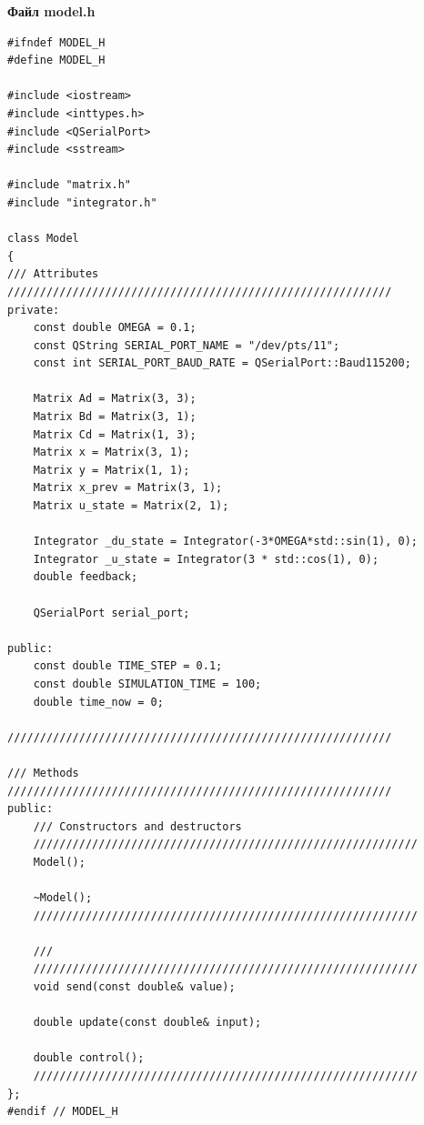 \documentclass[14pt,a4paper]{extreport}
\begin{document}
\textbf{Файл model.h}
\begin{alltt}
\begin{verbatim}
#ifndef MODEL_H
#define MODEL_H

#include <iostream>
#include <inttypes.h>
#include <QSerialPort>
#include <sstream>

#include "matrix.h"
#include "integrator.h"

class Model
{
/// Attributes
///////////////////////////////////////////////////////////
private:
    const double OMEGA = 0.1;
    const QString SERIAL_PORT_NAME = "/dev/pts/11";
    const int SERIAL_PORT_BAUD_RATE = QSerialPort::Baud115200;

    Matrix Ad = Matrix(3, 3);
    Matrix Bd = Matrix(3, 1);
    Matrix Cd = Matrix(1, 3);
    Matrix x = Matrix(3, 1);
    Matrix y = Matrix(1, 1);
    Matrix x_prev = Matrix(3, 1);
    Matrix u_state = Matrix(2, 1);

    Integrator _du_state = Integrator(-3*OMEGA*std::sin(1), 0);
    Integrator _u_state = Integrator(3 * std::cos(1), 0);
    double feedback;

    QSerialPort serial_port;

public:
    const double TIME_STEP = 0.1;
    const double SIMULATION_TIME = 100;
    double time_now = 0;

///////////////////////////////////////////////////////////

/// Methods
///////////////////////////////////////////////////////////
public:
    /// Constructors and destructors
    ///////////////////////////////////////////////////////////
    Model();

    ~Model();
    ///////////////////////////////////////////////////////////

    /// 
    ///////////////////////////////////////////////////////////
    void send(const double& value);

    double update(const double& input);

    double control();
    ///////////////////////////////////////////////////////////
};
#endif // MODEL_H
    
\end{verbatim}
\end{alltt}
\end{document}
